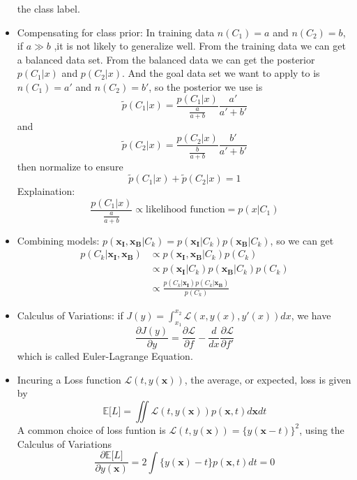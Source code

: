 \documentclass[12pt, a4paper]{article}
\begin{document}
\begin{itemize}
        the class label.
        \item Compensating for class prior: In training data $n(C_1)=a$ and $n(C_2)=b$, if 
        $a\gg b$ ,it is not likely to generalize well. From the training data we can get a 
        balanced data set. From the balanced data we can get the posterior $p(C_1|x)$ and 
        $p(C_2|x)$. And the goal data set we want to apply to is $n(C_1)=a'$ and $n(C_2)=b'$, 
        so the posterior we use is \[\widetilde{p}(C_1|x)=\frac{p(C_1|x)}{\frac{a}{a+b}}
        \frac{a'}{a'+b'}\] and \[\widetilde{p}(C_2|x)=\frac{p(C_2|x)}{\frac{b}{a+b}}
        \frac{b'}{a'+b'}\] then normalize to ensure
         \[\widetilde{p}(C_1|x)+\widetilde{p}(C_2|x)=1\]
         Explaination: 
         \[\frac{p(C_1|x)}{\frac{a}{a+b}}\propto \text{likelihood function}=p(x|C_1)\]
         \item Combining models: $p(\bm{x_I},\bm{x_B}|C_k)=p(\bm{x_I}|C_k)p(\bm{x_B}|C_k)$,
        so we can get
        \begin{align*}
            p(C_k|\bm{x_I},\bm{x_B})&\propto p(\bm{x_I},\bm{x_B}|C_k)p(C_k)\\
            &\propto p(\bm{x_I}|C_k)p(\bm{x_B}|C_k)p(C_k)\\
            &\propto \frac{p(C_k|\bm{x_I})p(C_k|\bm{x_B})}{p(C_k)}
        \end{align*}
        \item Calculus of Variations: if $J(y)=\int_{x_1}^{x_2}\mathcal{L}(x,y(x),y'(x))dx$, 
        we have 
        \begin{equation}
            \label{CalculusVariations}
            \frac{\partial J(y)}{\partial y}=\frac{\partial\mathcal{L}}{\partial f}-\frac{d}{dx}
            \frac{\partial\mathcal{L}}{\partial f'}
        \end{equation}
        which is called Euler-Lagrange Equation.
        \item Incuring a Loss function $\mathcal{L}(t,y(\bm{x}))$, the average, or expected, 
        loss is given by
        \begin{equation}
            \label{equ:loss:expectation}
            \mathbb{E}\lbrack L\rbrack=\iint\mathcal{L}(t,y(\bm{x}))p(\bm{x},t)d\bm{x}dt
        \end{equation}
        A common choice of loss funtion is $\mathcal{L}(t,y(\bm{x}))=\{y(\bm{x}-t)\}^2$, 
        using the Calculus of Variations
        \[
            \frac{\partial\mathbb{E}\lbrack L\rbrack}{\partial y(\bm{x})}=
            2\int\{y(\bm{x})-t\}p(\bm{x},t)dt=0
            \]

\end{itemize}
\end{document}
